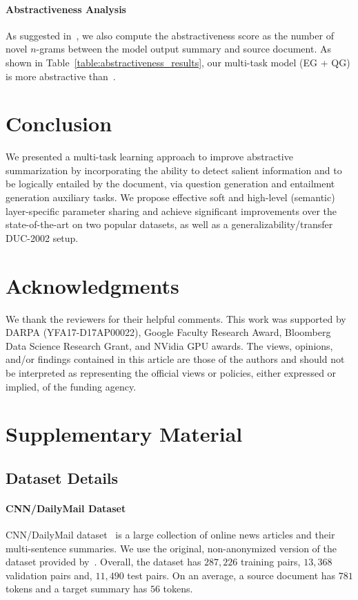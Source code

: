 \documentclass[11pt,a4paper]{article}
\begin{document}
\paragraph{Abstractiveness Analysis}
As suggested in~\citet{see2017get}, we also compute the abstractiveness score as the number of novel $n$-grams between the model output summary and source document. As shown in Table~\ref{table:abstractiveness_results}, our multi-task model (EG + QG) is more abstractive than~\citet{see2017get}. 



 
\section{Conclusion}
We presented a multi-task learning approach to improve abstractive summarization by incorporating the ability to detect salient information and to be logically entailed by the document, via question generation and entailment generation auxiliary tasks. We propose effective soft and high-level (semantic) layer-specific parameter sharing and achieve significant improvements over the state-of-the-art on two popular datasets, as well as a generalizability/transfer DUC-2002 setup. 

\section*{Acknowledgments}
We thank the reviewers for their helpful comments. This work was supported by DARPA (YFA17-D17AP00022), Google Faculty Research Award, Bloomberg Data Science Research Grant, and NVidia GPU awards. The views, opinions, and/or findings contained in this article are those of the authors and should not be interpreted as representing the official views or policies, either expressed or implied, of the funding agency.




\appendix

\section{Supplementary Material}

\subsection{Dataset Details}
\label{sec:datasetsapp}
\paragraph{CNN/DailyMail Dataset}
CNN/DailyMail dataset~\cite{hermann2015teaching,nallapati2016abstractive} is a large collection of online news articles and their multi-sentence summaries. We use the original, non-anonymized version of the dataset provided by~. Overall, the dataset has $287,226$ training pairs, $13,368$ validation pairs and, $11,490$ test pairs. On an average, a source document has $781$ tokens and a target summary has $56$ tokens.
\end{document}
